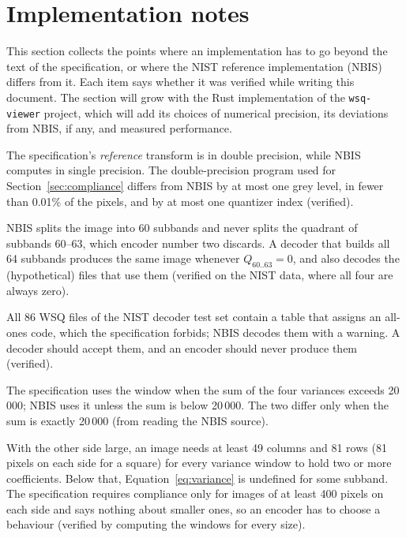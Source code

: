 \section{Implementation notes}
\label{sec:implementation}

This section collects the points where an implementation has to go beyond the text of the
specification, or where the NIST reference implementation (NBIS) differs from it. Each item says
whether it was verified while writing this document. The section will grow with the Rust
implementation of the \texttt{wsq-viewer} project, which will add its choices of numerical
precision, its deviations from NBIS, if any, and measured performance.

\begin{description}[leftmargin=0pt]
  \item[Precision.] The specification's \emph{reference} transform is in double precision, while
    NBIS computes in single precision. The double-precision program used for
    Section~\ref{sec:compliance} differs from NBIS by at most one grey level, in fewer than
    0.01\% of the pixels, and by at most one quantizer index (verified).

  \item[The full tree.] NBIS splits the image into 60 subbands and never splits the quadrant of
    subbands 60--63, which encoder number two discards. A decoder that builds all 64 subbands
    produces the same image whenever $Q_{60..63} = 0$, and also decodes the (hypothetical) files
    that use them (verified on the NIST data, where all four are always zero).

  \item[All-ones Huffman codes.] All 86 WSQ files of the NIST decoder test set contain a table
    that assigns an all-ones code, which the specification forbids; NBIS decodes them with a
    warning. A decoder should accept them, and an encoder should never produce them (verified).

  \item[Variance switch.] The specification uses the window when the sum of the four variances
    exceeds 20\,000; NBIS uses it unless the sum is below 20\,000. The two differ only when the sum
    is exactly 20\,000 (from reading the NBIS source).

  \item[Small images.] With the other side large, an image needs at least 49 columns and 81 rows
    (81 pixels on each side for a square) for every variance window to hold two or more
    coefficients. Below that, Equation~\eqref{eq:variance} is undefined for some subband. The
    specification requires compliance only for images of at least 400 pixels on each side and
    says nothing about smaller ones, so an encoder has to choose a behaviour (verified by
    computing the windows for every size).


\end{description}
